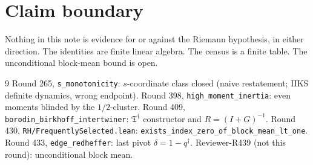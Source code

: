 \documentclass[11pt]{article}
\theoremstyle{remark}
\newcommand{\Td}{\mathfrak{T}^{\dagger}}
\begin{document}
\section*{Claim boundary}

Nothing in this note is evidence for or against the Riemann
hypothesis, in either direction.  The identities are finite
linear algebra.  The census is a finite table.  The
unconditional block-mean bound is open.

\begin{thebibliography}{9}
 Round 265, \texttt{s\_monotonicity}: $s$-coordinate
  class closed (naive restatement; IIKS definite dynamics, wrong
  endpoint).
 Round 398, \texttt{high\_moment\_inertia}: even
  moments blinded by the $1/2$-cluster.
 Round 409, \texttt{borodin\_birkhoff\_intertwiner}:
  $\Td$ constructor and $R=(I+G)^{-1}$.
 Round 430, \texttt{RH/FrequentlySelected.lean}:
  \texttt{exists\_index\_zero\_of\_block\_mean\_lt\_one}.
 Round 433, \texttt{edge\_redheffer}: last pivot
  $\delta=1-q^{\dagger}$.
 Reviewer-R439 (not this round): unconditional
  block mean.
\end{thebibliography}
\end{document}

